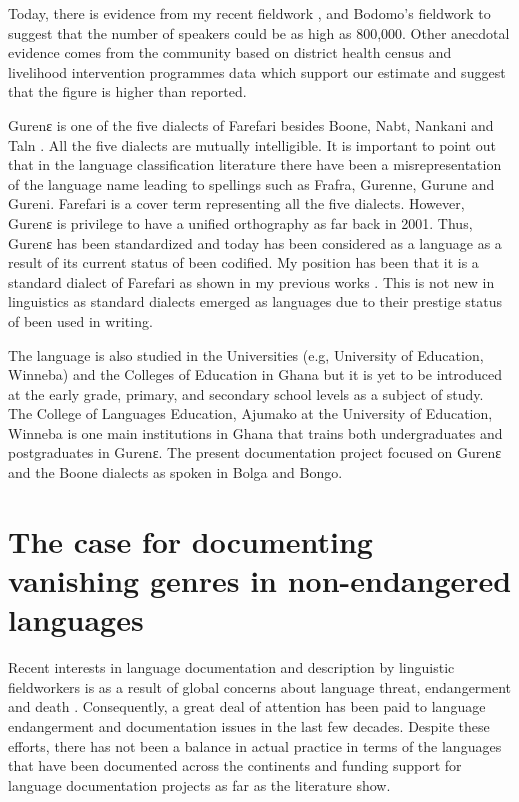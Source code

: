 \documentclass[output=paper,colorlinks,citecolor=brown]{langscibook}
\begin{document}
Today, there is evidence from my recent fieldwork \citep{Atintono2013, Atintono2020}, and Bodomo's \citeyear{Bodomo2004, Bodomo2020} fieldwork to suggest that the number of speakers could be as high as 800,000. Other anecdotal evidence comes from the community based on district health census and livelihood intervention programmes data which support our estimate and suggest that the figure is higher than reported. 

Gurenɛ is one of the five dialects of Farefari besides Boone, Nabt, Nankani and Taln \citep{Dakubu1995, Nsoh1997, Nsoh2011, Atintono2002, Atintono2004, Atintono2011, Atintono2013, Atintono2019}. All the five dialects are mutually intelligible. It is important to point out that in the language classification literature there have been a misrepresentation of the language name leading to spellings such as Frafra, Gurenne, Gurune and Gureni. Farefari is a cover term representing all the five dialects. However, Gurenɛ is privilege to have a unified orthography as far back in 2001. Thus, Gurenɛ has been standardized and today has been considered as a language as a result of its current status of been codified. My position has been that it is a standard dialect of Farefari as shown in my previous works \citep{Atintono2002, Atintono2004, Atintono2011, Atintono2013}. This is not new in linguistics as standard dialects emerged as languages due to their prestige status of been used in writing.

The language is also studied in the Universities (e.g, University of Education, Winneba) and the Colleges of Education in Ghana but it is yet to be introduced at the early grade, primary, and secondary school levels as a subject of study. The College of Languages Education, Ajumako at the University of Education, Winneba is one main institutions in Ghana that trains both undergraduates and postgraduates in Gurenɛ. The present documentation project focused on Gurenɛ and the Boone dialects as spoken in Bolga and Bongo.

\section{The case for documenting vanishing genres in non-endangered languages }
Recent interests in language documentation and description by linguistic fieldworkers is as a result of global concerns about language threat, endangerment and death \citep{HaleEtAl1992, Himmelmann1998, HimmelmannEtAl2006, GrenobleWhaley1996, Crystal2000, Crystal2003, Woodbury2003, Austin2003, Austin2006, GippertEtAl2006, Bowern2015, ChelliahWillem2010, EssegbeyEtAl2015}. Consequently, a great deal of attention has been paid to language endangerment and documentation issues in the last few decades. Despite these efforts, there has not been a balance in actual practice in terms of the languages that have been documented across the continents and funding support for language documentation projects as far as the literature show. 
\end{document}
